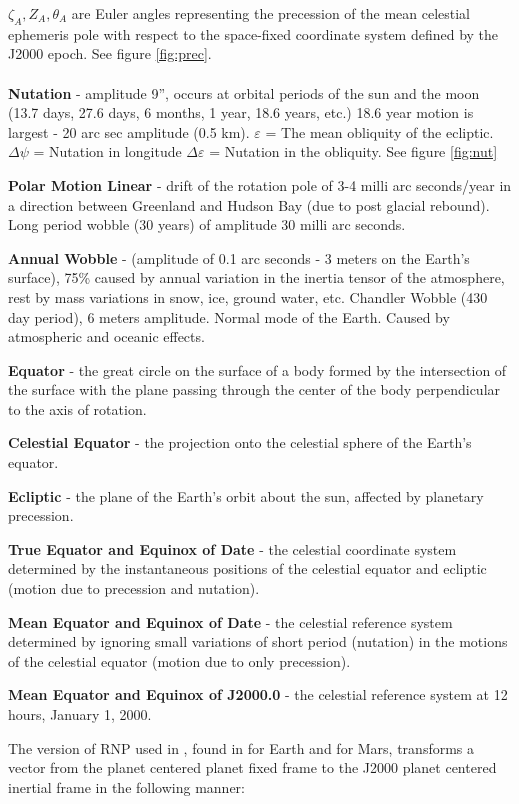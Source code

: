 $\zeta _A ,Z_A ,\theta _A $ are Euler angles representing the
precession of the mean celestial ephemeris pole with respect to
the space-fixed coordinate system defined by the J2000 epoch.
See figure \ref{fig:prec}. \\ \\
\textbf{Nutation} - amplitude 9'', occurs at orbital periods of
the sun and the moon (13.7 days, 27.6 days, 6 months,
1 year, 18.6 years, etc.) 18.6 year motion is largest - 20
arc sec amplitude (0.5 km).
$\varepsilon$ = The mean obliquity of the ecliptic.
$\Delta \psi$ = Nutation in longitude
$\Delta \varepsilon$ = Nutation in the obliquity.
See figure \ref{fig:nut}

\textbf{Polar Motion Linear} - drift of the rotation pole of 3-4 milli arc
seconds/year in a direction between Greenland and Hudson Bay (due to
post glacial rebound).  Long period wobble (30 years) of amplitude
30 milli arc seconds.

\textbf{Annual Wobble} - (amplitude of 0.1 arc seconds - 3
meters on the Earth's surface), 75{\%} caused by annual
variation in the inertia tensor of the atmosphere, rest
by mass variations in snow, ice, ground water, etc.
Chandler Wobble (430 day period), 6 meters amplitude.
Normal mode of the Earth. Caused by atmospheric and oceanic effects.

\textbf{Equator} - the great circle on the surface of a body formed by the
intersection of the surface with the plane passing through the center of the
body perpendicular to the axis of rotation.

\textbf{Celestial Equator} - the projection onto the celestial sphere
of the Earth's equator.

\textbf{Ecliptic} - the plane of the Earth's orbit about the sun,
affected by planetary precession.

\textbf{True Equator and Equinox of Date} - the celestial coordinate system
determined by the instantaneous positions of the celestial equator and
ecliptic (motion due to precession and nutation).

\textbf{Mean Equator and Equinox of Date} - the celestial reference system
determined by ignoring small variations of short period (nutation) in the
motions of the celestial equator (motion due to only precession).

\textbf{Mean Equator and Equinox of J2000.0} - the celestial reference system
at 12 hours, January 1, 2000.\newline

The version of RNP used
in \JEODid, found in \cite{ValladoThird} for Earth and \cite{Konopliv06} for
Mars, transforms a vector from the planet centered planet fixed frame to the
J2000 planet centered inertial frame in the following manner:

